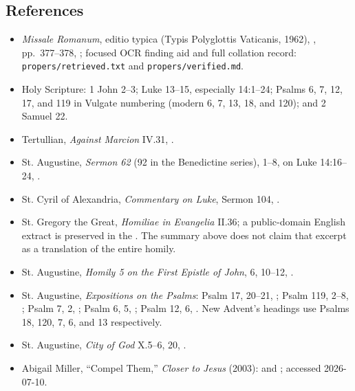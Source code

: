 \begin{deepstudy}
\newpage
\sectionguard
\section*{References}
{\small
\begin{itemize}
\item \emph{Missale Romanum}, editio typica (Typis Polyglottis Vaticanis, 1962), , pp.~377--378, ; focused OCR finding aid and full collation record: \nolinkurl{propers/retrieved.txt} and \nolinkurl{propers/verified.md}.
\item Holy Scripture: 1 John 2--3; Luke 13--15, especially 14:1--24; Psalms 6, 7, 12, 17, and 119 in Vulgate numbering (modern 6, 7, 13, 18, and 120); and 2 Samuel 22.
\item Tertullian, \emph{Against Marcion} IV.31, .
\item St. Augustine, \emph{Sermon 62} (92 in the Benedictine series), 1--8, on Luke 14:16--24, .
\item St. Cyril of Alexandria, \emph{Commentary on Luke}, Sermon 104, .
\item St. Gregory the Great, \emph{Homiliae in Evangelia} II.36; a public-domain English extract is preserved in the . The summary above does not claim that excerpt as a translation of the entire homily.
\item St. Augustine, \emph{Homily 5 on the First Epistle of John}, 6, 10--12, .
\item St. Augustine, \emph{Expositions on the Psalms}: Psalm 17, 20--21, ; Psalm 119, 2--8, ; Psalm 7, 2, ; Psalm 6, 5, ; Psalm 12, 6, . New Advent's headings use Psalms 18, 120, 7, 6, and 13 respectively.
\item St. Augustine, \emph{City of God} X.5--6, 20, .
\item Abigail Miller, ``Compel Them,'' \emph{Closer to Jesus} (2003):  and ; accessed 2026-07-10.
\end{itemize}
}


\end{deepstudy}
